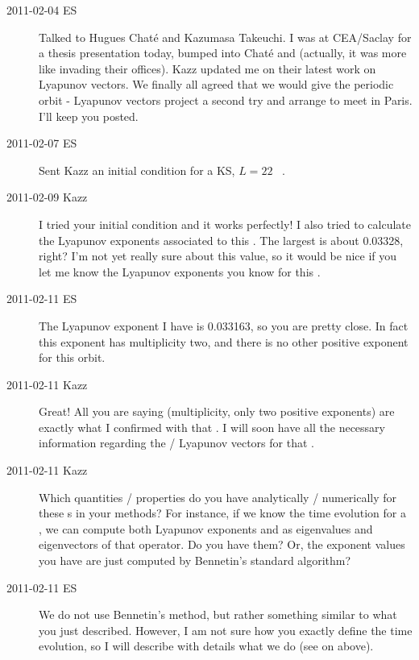 \begin{description}
\item[2011-02-04 ES] Talked to Hugues Chat\'{e} and Kazumasa Takeuchi.
  I was at CEA/Saclay for a thesis presentation today, bumped into Chat\'{e}
  and
  (actually, it was more like invading their offices). Kazz updated me on
  their latest work on Lyapunov vectors. We finally all agreed that we would give
  the periodic orbit - Lyapunov vectors project a second try and arrange to meet
  in Paris. I'll keep you posted.


\item[2011-02-07 ES] Sent Kazz an initial condition for a KS, $L=22$ \po\
  .


\item[2011-02-09 Kazz] I tried your initial condition and it works perfectly!
  I also tried to calculate the Lyapunov exponents associated to this {\po}.
  The largest is about 0.03328, right? I'm not yet really sure about this value,
  so it would be nice if you let me know the Lyapunov exponents you know for this {\po}.

\item[2011-02-11 ES] The Lyapunov exponent I have is 0.033163, so you
  are pretty close. In fact this exponent has multiplicity two, and
  there is no other positive exponent for this orbit.

\item[2011-02-11 Kazz] Great! All you are saying (multiplicity, only two positive
  exponents) are exactly what I confirmed with that {\po}. I will soon have all
  the necessary information regarding the {\entangled}/{\transient} Lyapunov vectors for that {\po}.

\item[2011-02-11 Kazz] Which quantities / properties do you have
  analytically / numerically for these \po s in your methods? For instance,
  if we know the time evolution  for a {\po}, we can compute both
  Lyapunov exponents and {\cLvs} as eigenvalues and
  eigenvectors of that operator. Do you have them? Or, the exponent values
  you have are just computed by Bennetin's standard algorithm?

  \renewcommand{\ssp}{x}

\item[2011-02-11 ES] We do not use Bennetin's method, but rather
  something similar to what you just described. However, I am not sure how
  you exactly define the time evolution, so I will describe with
  details what we do (see \refrem{rem:Lyapunov} on  above).


\end{description}
